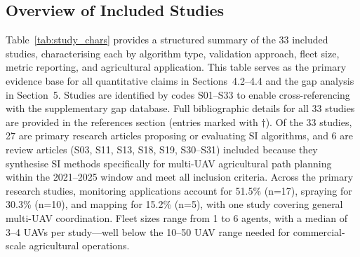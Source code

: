 \documentclass[review,3p,times]{elsarticle}
\begin{document}
\subsection{Overview of Included Studies}
Table~\ref{tab:study_chars} provides a structured summary of the 33 included studies, characterising each by algorithm type, validation approach, fleet size, metric reporting, and agricultural application. This table serves as the primary evidence base for all quantitative claims in Sections~4.2--4.4 and the gap analysis in Section~5. Studies are identified by codes S01--S33 to enable cross-referencing with the supplementary gap database. Full bibliographic details for all 33 studies are provided in the references section (entries marked with $\dagger$). Of the 33 studies, 27 are primary research articles proposing or evaluating SI algorithms, and 6 are review articles (S03, S11, S13, S18, S19, S30--S31) included because they synthesise SI methods specifically for multi-UAV agricultural path planning within the 2021--2025 window and meet all inclusion criteria. Across the primary research studies, monitoring applications account for 51.5\% (n=17), spraying for 30.3\% (n=10), and mapping for 15.2\% (n=5), with one study covering general multi-UAV coordination. Fleet sizes range from 1 to 6 agents, with a median of 3--4 UAVs per study---well below the 10--50 UAV range needed for commercial-scale agricultural operations.
\end{document}
